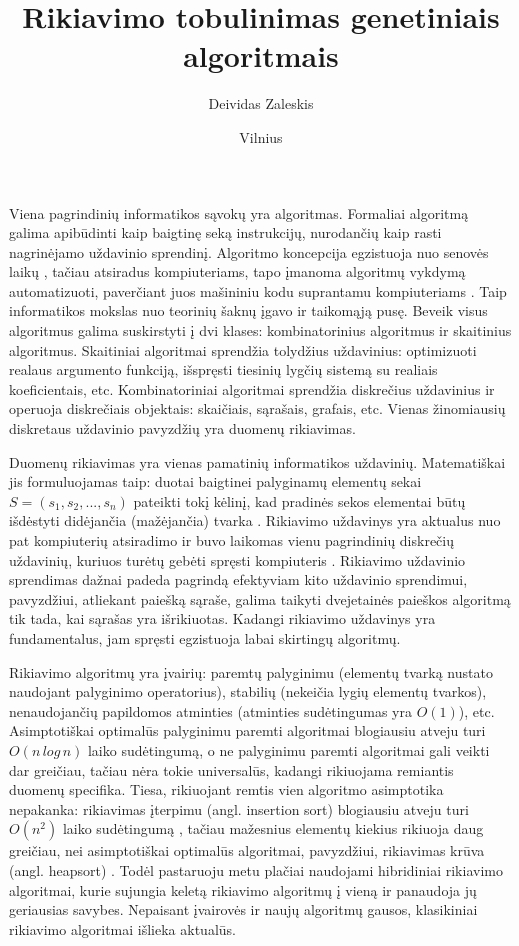 \documentclass{VUMIFInfKursinis}
\institute{Informatikos institutas}  %
\title{Rikiavimo tobulinimas genetiniais algoritmais}
\author{Deividas Zaleskis}
\date{Vilnius \\ \the\year}
\begin{document}
\maketitle

\tableofcontents


Viena pagrindinių informatikos sąvokų yra algoritmas.
Formaliai algoritmą galima apibūdinti kaip
baigtinę seką instrukcijų, nurodančių kaip rasti nagrinėjamo uždavinio sprendinį.
Algoritmo koncepcija egzistuoja nuo senovės laikų \cite{knuth1972ancient}, tačiau atsiradus kompiuteriams,
tapo įmanoma algoritmų vykdymą automatizuoti, paverčiant juos mašininiu kodu suprantamu kompiuteriams \cite{wilkes1951preparation}.
Taip informatikos mokslas nuo teorinių šaknų \cite{turing1937computable} įgavo ir taikomąją pusę.
Beveik visus algoritmus galima suskirstyti į dvi klases: kombinatorinius algoritmus ir skaitinius algoritmus.
Skaitiniai algoritmai sprendžia tolydžius uždavinius: optimizuoti realaus argumento funkciją, išspręsti tiesinių lygčių sistemą su realiais koeficientais, etc.
Kombinatoriniai algoritmai sprendžia diskrečius uždavinius ir operuoja diskrečiais objektais: skaičiais, sąrašais, grafais, etc.
Vienas žinomiausių diskretaus uždavinio pavyzdžių yra duomenų rikiavimas.

Duomenų rikiavimas yra vienas pamatinių informatikos uždavinių.
Matematiškai jis formuluojamas taip:
duotai baigtinei palyginamų elementų sekai $S = (s_1, s_2, ..., s_n)$ pateikti tokį
kėlinį, kad pradinės sekos elementai būtų išdėstyti didėjančia (mažėjančia) tvarka \cite{Radavičius_Baranauskas_2013}.
Rikiavimo uždavinys yra aktualus nuo pat kompiuterių atsiradimo ir buvo laikomas vienu 
pagrindinių diskrečių uždavinių, kuriuos turėtų gebėti spręsti kompiuteris \cite{10.1145/356580.356581}.
Rikiavimo uždavinio sprendimas dažnai padeda pagrindą efektyviam kito uždavinio sprendimui,
pavyzdžiui, atliekant paiešką sąraše, galima taikyti dvejetainės paieškos algoritmą tik tada,
kai sąrašas yra išrikiuotas.
Kadangi rikiavimo uždavinys yra fundamentalus, jam spręsti egzistuoja labai skirtingų algoritmų.

Rikiavimo algoritmų yra įvairių:
paremtų palyginimu (elementų tvarką nustato naudojant palyginimo operatorius),
stabilių (nekeičia lygių elementų tvarkos),
nenaudojančių papildomos atminties (atminties sudėtingumas yra $O(1)$), etc.
Asimptotiškai optimalūs palyginimu paremti algoritmai blogiausiu atveju turi $O(n\,log\,n)$ laiko sudėtingumą,
o ne palyginimu paremti algoritmai gali veikti dar greičiau, tačiau nėra tokie universalūs, kadangi rikiuojama remiantis duomenų specifika.
Tiesa, rikiuojant remtis vien algoritmo asimptotika nepakanka:
rikiavimas įterpimu (angl. insertion sort) blogiausiu atveju turi $O(n^2)$ laiko sudėtingumą \cite{bender2006insertion},
tačiau mažesnius elementų kiekius rikiuoja daug greičiau, nei asimptotiškai optimalūs algoritmai,
pavyzdžiui, rikiavimas krūva (angl. heapsort) \cite{10.1145/512274.512284}.
Todėl pastaruoju metu plačiai naudojami hibridiniai rikiavimo algoritmai, kurie sujungia keletą rikiavimo
algoritmų į vieną ir panaudoja jų geriausias savybes.
Nepaisant įvairovės ir naujų algoritmų gausos, klasikiniai rikiavimo algoritmai išlieka aktualūs.
\end{document}
